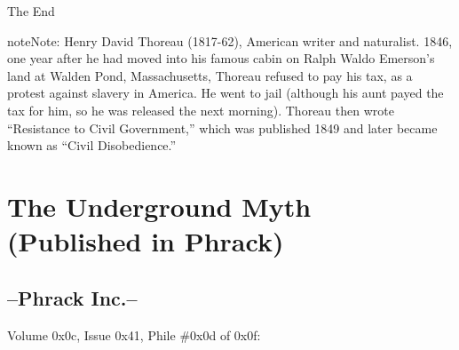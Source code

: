 \documentclass[letterpaper,12pt,english]{sphinxmanual}
\begin{document}
The End

\begin{notice}{note}{Note:}
Henry David Thoreau (1817-62), American writer and naturalist. 1846, one year after he had moved into his famous cabin on Ralph Waldo Emerson's land at Walden Pond, Massachusetts, Thoreau refused to pay his tax, as a protest against slavery in America. He went to jail (although his aunt payed the tax for him, so he was released the next morning). Thoreau then wrote ``Resistance to Civil Government,'' which was published 1849 and later became known as ``Civil Disobedience.''
\end{notice}


\chapter{The Underground Myth (Published in Phrack)}
\label{underground-myth::doc}\label{underground-myth:the-underground-myth-published-in-phrack}

\section{--Phrack Inc.--}
\label{underground-myth:phrack-inc}
Volume 0x0c, Issue 0x41, Phile \#0x0d of 0x0f:
\end{document}
